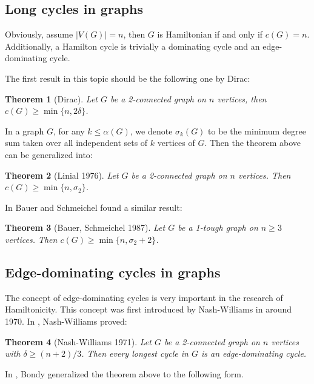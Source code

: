 \documentclass[12pt]{report}
\newtheorem{theorem}{Theorem}
\begin{document}
\subsection{Long cycles in graphs}

Obviously, assume $|V(G)|=n$, then $G$ is Hamiltonian if and only if $c(G)=n$. Additionally, a Hamilton cycle is trivially a dominating cycle and an edge-dominating cycle.

The first result in this topic should be the following one by Dirac:



\begin{theorem}[Dirac]
Let $G$ be a 2-connected graph on $n$ vertices, then $c(G)\ge\min\{n,2\delta\}$.
\end{theorem}

In a graph $G$, for any $k\le\alpha(G)$, we denote $\sigma_k(G)$ to be the minimum degree sum taken over all independent sets of $k$ vertices of $G$.
Then the theorem above can be generalized \cite{linial1976lower} into:
\begin{theorem}[Linial 1976]
Let $G$ be a 2-connected graph on $n$ vertices. Then $c(G)\ge\min\{n,\sigma_2\}$.
\end{theorem}


In \cite{bauer1987long} Bauer and Schmeichel found a similar result:
\begin{theorem}[Bauer, Schmeichel 1987]\label{bauschd2}
Let $G$ be a 1-tough graph on $n\ge3$ vertices. Then $c(G)\ge \min\{n,\sigma_2+2\}$.
\end{theorem}








\subsection{Edge-dominating cycles in graphs}

The concept of edge-dominating cycles is very important in the research of Hamiltonicity. This concept was first introduced by Nash-Williams in around 1970. In \cite{nash1971edge}, Nash-Williams proved:
\begin{theorem}[Nash-Williams 1971]\label{nashd}
Let $G$ be a 2-connected graph on $n$ vertices with $\delta\ge(n+2)/3$. Then every longest cycle in $G$ is an edge-dominating cycle.
\end{theorem}


In \cite{bondy1980longest}, Bondy generalized the theorem above to the following form.
\end{document}
